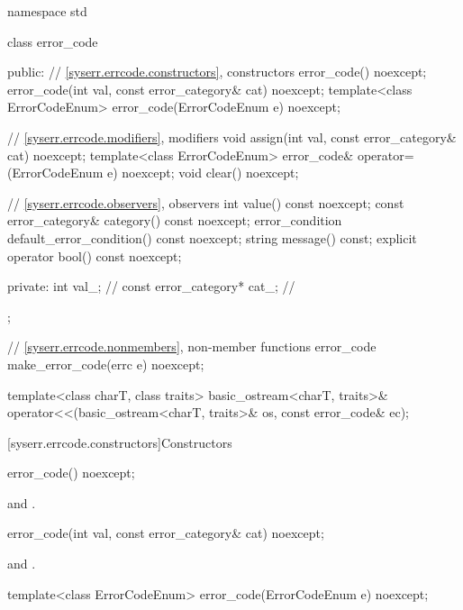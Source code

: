 %
\begin{codeblock}
namespace std {
  class error_code {
  public:
    // \ref{syserr.errcode.constructors}, constructors
    error_code() noexcept;
    error_code(int val, const error_category& cat) noexcept;
    template<class ErrorCodeEnum>
      error_code(ErrorCodeEnum e) noexcept;

    // \ref{syserr.errcode.modifiers}, modifiers
    void assign(int val, const error_category& cat) noexcept;
    template<class ErrorCodeEnum>
      error_code& operator=(ErrorCodeEnum e) noexcept;
    void clear() noexcept;

    // \ref{syserr.errcode.observers}, observers
    int value() const noexcept;
    const error_category& category() const noexcept;
    error_condition default_error_condition() const noexcept;
    string message() const;
    explicit operator bool() const noexcept;

  private:
    int val_;                   // \expos
    const error_category* cat_; // \expos
  };

  // \ref{syserr.errcode.nonmembers}, non-member functions
  error_code make_error_code(errc e) noexcept;

  template<class charT, class traits>
    basic_ostream<charT, traits>&
      operator<<(basic_ostream<charT, traits>& os, const error_code& ec);
}
\end{codeblock}

[syserr.errcode.constructors]{Constructors}

%
\begin{itemdecl}
error_code() noexcept;
\end{itemdecl}

\begin{itemdescr}
\pnum
\ensures
{} and .
\end{itemdescr}

%
\begin{itemdecl}
error_code(int val, const error_category& cat) noexcept;
\end{itemdecl}

\begin{itemdescr}
\pnum
\ensures
{} and .
\end{itemdescr}

%
\begin{itemdecl}
template<class ErrorCodeEnum>
  error_code(ErrorCodeEnum e) noexcept;
\end{itemdecl}

